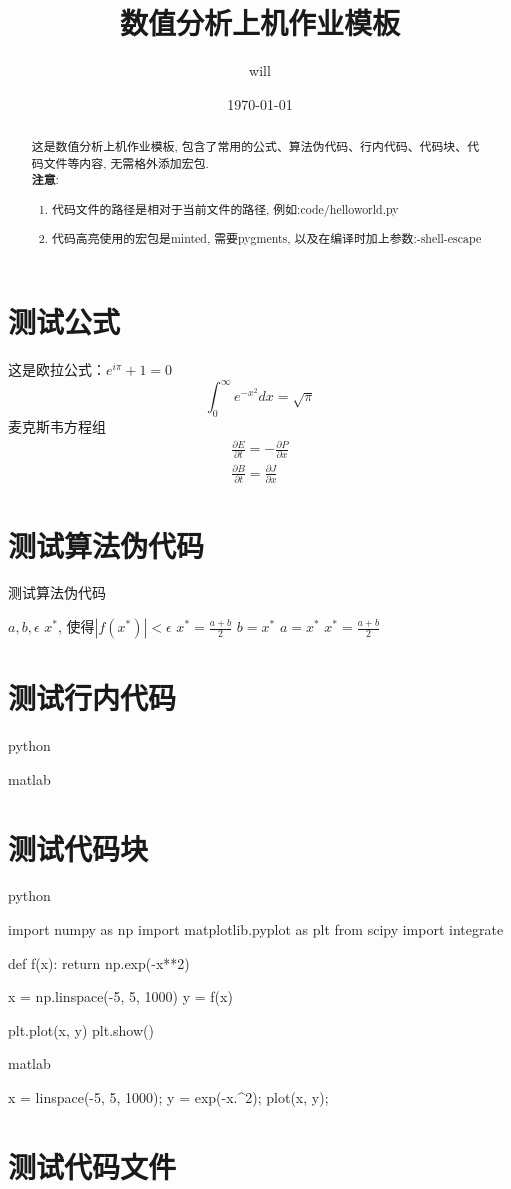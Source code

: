 \documentclass[11pt,a4paper]{TGNA}
\title{\textbf{数值分析上机作业模板}}
\author{will}
\date{\today}
\begin{document}
\maketitle
\begin{abstract}
    这是数值分析上机作业模板, 包含了常用的公式、算法伪代码、行内代码、代码块、代码文件等内容, 无需格外添加宏包.\\
    \textbf{注意}:
    \begin{enumerate}
        \item 代码文件的路径是相对于当前文件的路径, 例如:code/helloworld.py
        \item 代码高亮使用的宏包是minted, 需要pygments, 以及在编译时加上参数:-shell-escape
    \end{enumerate}
\end{abstract}
\section{测试公式}
这是欧拉公式：$e^{i\pi}+1=0$
$$
\int_{0}^{\infty} e^{-x^2} dx = \sqrt{\pi}
$$
麦克斯韦方程组
$$
\begin{aligned}
    \frac{\partial E}{\partial t} = -\frac{\partial P}{\partial x} \\
\frac{\partial B}{\partial t} = \frac{\partial J}{\partial x}
\end{aligned}
$$

\section{测试算法伪代码}
\begin{algorithm}
\caption{测试算法伪代码}
\begin{algorithmic}
\REQUIRE $a, b, \epsilon$
\ENSURE $x^*$, 使得$|f(x^*)| < \epsilon$
\STATE $x^* = \frac{a + b}{2}$
\STATE $b = x^*$
\ELSE
\STATE $a = x^*$
\ENDIF
\STATE $x^* = \frac{a + b}{2}$
\ENDWHILE
\end{algorithmic}
\end{algorithm}
\section{测试行内代码}
python\\

matlab\\

\section{测试代码块}
python
\begin{pythoncode}
import numpy as np
import matplotlib.pyplot as plt
from scipy import integrate

def f(x):
    return np.exp(-x**2)

x = np.linspace(-5, 5, 1000)
y = f(x)

plt.plot(x, y)
plt.show()
\end{pythoncode}

matlab
\begin{matlabcode}
x = linspace(-5, 5, 1000);
y = exp(-x.^2);
plot(x, y);
\end{matlabcode}

\section{测试代码文件}

\end{document}
